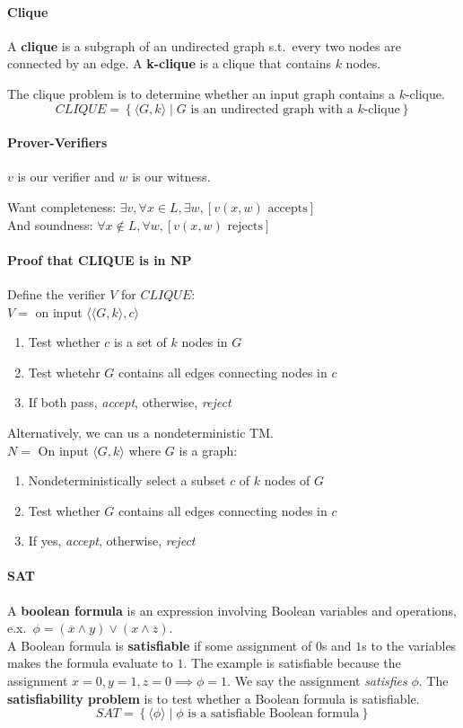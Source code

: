 \documentclass[12 pt]{article}
\begin{document}
\paragraph{Clique} A \textbf{clique} is a subgraph of an undirected
graph s.t.\ every two nodes are connected by an edge. A
\textbf{k-clique} is a clique that contains $k$ nodes.

The clique problem is to determine whether an input graph contains a
$k$-clique.
$$CLIQUE = \left\{\langle G,k \rangle \mid G \text{ is an undirected
    graph with a }k \text{-clique}\right\}$$
\paragraph{Prover-Verifiers}
$v$ is our verifier and $w$ is our witness.

Want completeness:
$\exists v, \forall x \in L, \exists w, [v(x,w) \text{ accepts}]$
\\ And soundness:
$\forall x \notin L, \forall w, [v(x,w) \text{ rejects}]$
\paragraph{Proof that CLIQUE is in NP}
Define the verifier $V$ for $CLIQUE$:
\\ $V = $ on input $\langle \langle G,k \rangle,c \rangle$
\begin{enumerate}
\item Test whether $c$ is a set of $k$ nodes in $G$
\item Test whetehr $G$ contains all edges connecting nodes in $c$
\item If both pass, \textit{accept}, otherwise, \textit{reject}
\end{enumerate}
Alternatively, we can us a nondeterministic TM.
\\ $N =$ On input $\langle G,k \rangle$ where $G$ is a graph:
\begin{enumerate}
\item Nondeterministically select a subset $c$ of $k$ nodes of $G$
\item Test whether $G$ contains all edges connecting nodes in $c$
\item If yes, \textit{accept}, otherwise, \textit{reject}
\end{enumerate}
\paragraph{SAT} A \textbf{boolean formula} is an expression involving
Boolean variables and operations, e.x.\ $\phi = (\overline{x} \land
y) \lor (x \land \overline{z})$.
\\ A Boolean formula is \textbf{satisfiable} if some assignment of
$0$s and $1$s to the  variables makes the formula evaluate to $1$. The
example is satisfiable because the assignment $x=0, y=1, z=0 \implies
\phi = 1$. We say the assignment \textit{satisfies} $\phi$. The
\textbf{satisfiability problem} is to test whether a Boolean formula
is satisfiable.
$$ SAT = \left\{\langle \phi \rangle \mid \phi \text{ is a satisfiable
    Boolean formula}\right\}$$
\end{document}
